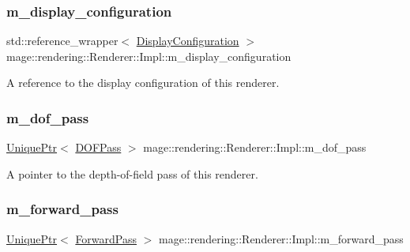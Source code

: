 \subsubsection{\texorpdfstring{m\+\_\+display\+\_\+configuration}{m\_display\_configuration}}
{\footnotesize\ttfamily std\+::reference\+\_\+wrapper$<$ \hyperlink{classmage_1_1rendering_1_1_display_configuration}{Display\+Configuration} $>$ mage\+::rendering\+::\+Renderer\+::\+Impl\+::m\+\_\+display\+\_\+configuration\hspace{0.3cm}{\ttfamily [private]}}

A reference to the display configuration of this renderer. \hypertarget{classmage_1_1rendering_1_1_renderer_1_1_impl_a6ac5ccc13646575c8feeeb2974f21dc3}{}\label{classmage_1_1rendering_1_1_renderer_1_1_impl_a6ac5ccc13646575c8feeeb2974f21dc3} 
\subsubsection{\texorpdfstring{m\+\_\+dof\+\_\+pass}{m\_dof\_pass}}
{\footnotesize\ttfamily \hyperlink{namespacemage_a3316d7143a973e37adf1110f2e80ca31}{Unique\+Ptr}$<$ \hyperlink{classmage_1_1rendering_1_1_d_o_f_pass}{D\+O\+F\+Pass} $>$ mage\+::rendering\+::\+Renderer\+::\+Impl\+::m\+\_\+dof\+\_\+pass\hspace{0.3cm}{\ttfamily [private]}}

A pointer to the depth-\/of-\/field pass of this renderer. \hypertarget{classmage_1_1rendering_1_1_renderer_1_1_impl_aa62d3e015ddcc7b48d423ad0e55a82d7}{}\label{classmage_1_1rendering_1_1_renderer_1_1_impl_aa62d3e015ddcc7b48d423ad0e55a82d7} 
\subsubsection{\texorpdfstring{m\+\_\+forward\+\_\+pass}{m\_forward\_pass}}
{\footnotesize\ttfamily \hyperlink{namespacemage_a3316d7143a973e37adf1110f2e80ca31}{Unique\+Ptr}$<$ \hyperlink{classmage_1_1rendering_1_1_forward_pass}{Forward\+Pass} $>$ mage\+::rendering\+::\+Renderer\+::\+Impl\+::m\+\_\+forward\+\_\+pass\hspace{0.3cm}{\ttfamily [private]}}


